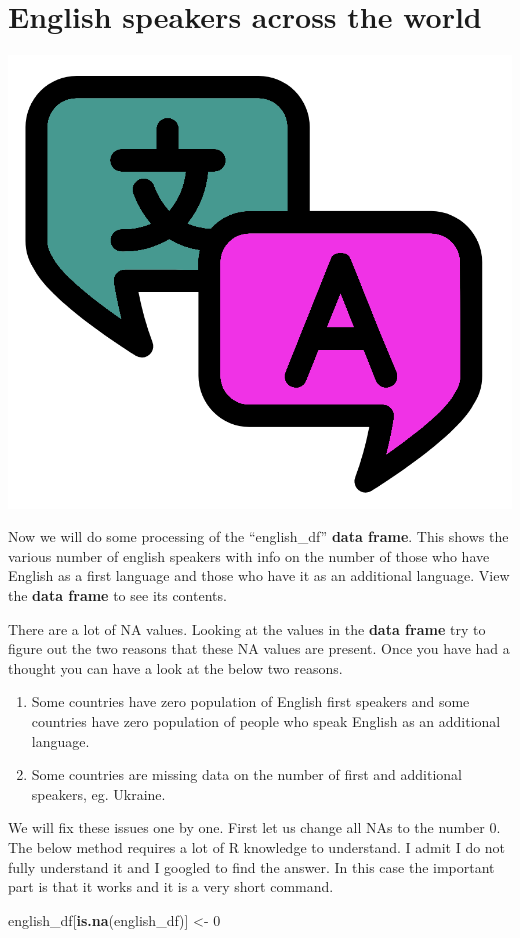\documentclass[]{book}
\newenvironment{Shaded}{\begin{snugshade}}{\end{snugshade}}
\newcommand{\KeywordTok}[1]{\textcolor[rgb]{0.13,0.29,0.53}{\textbf{#1}}}
\newcommand{\DecValTok}[1]{\textcolor[rgb]{0.00,0.00,0.81}{#1}}
\newcommand{\StringTok}[1]{\textcolor[rgb]{0.31,0.60,0.02}{#1}}
\newcommand{\NormalTok}[1]{#1}
\providecommand{\tightlist}{%
  \setlength{\itemsep}{0pt}\setlength{\parskip}{0pt}}
\begin{document}
\section{English speakers across the
world}\label{english-speakers-across-the-world}

\begin{center}\includegraphics[width=0.2\linewidth]{figures/language} \end{center}

Now we will do some processing of the ``english\_df'' \textbf{data
frame}. This shows the various number of english speakers with info on
the number of those who have English as a first language and those who
have it as an additional language. View the \textbf{data frame} to see
its contents.

There are a lot of NA values. Looking at the values in the \textbf{data
frame} try to figure out the two reasons that these NA values are
present. Once you have had a thought you can have a look at the below
two reasons.

\begin{enumerate}
\def\labelenumi{\arabic{enumi}.}
\tightlist
\item
  Some countries have zero population of English first speakers and some
  countries have zero population of people who speak English as an
  additional language.
\item
  Some countries are missing data on the number of first and additional
  speakers, eg. Ukraine.
\end{enumerate}

We will fix these issues one by one. First let us change all NAs to the
number 0. The below method requires a lot of R knowledge to understand.
I admit I do not fully understand it and I googled to find the answer.
In this case the important part is that it works and it is a very short
command.

\begin{Shaded}
\begin{Highlighting}[]
\NormalTok{english_df[}\KeywordTok{is.na}\NormalTok{(english_df)] <-}\StringTok{ }\DecValTok{0}
\end{Highlighting}
\end{Shaded}
\end{document}
